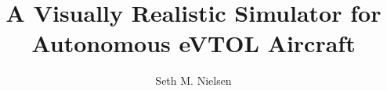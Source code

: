 \documentclass[12pt,oneside]{report}
\begin{document}
\title{A Visually Realistic Simulator for Autonomous eVTOL Aircraft}

\author{Seth M. Nielsen}

\showBYUHeader








\cleardoublepage{}


\appendix


\end{document}
